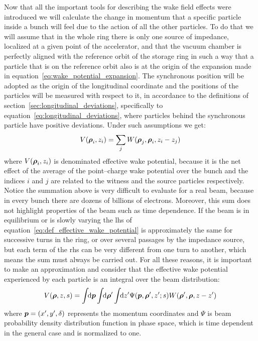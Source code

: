    Now that all the important tools for describing the wake field effects were introduced we will calculate the change in momentum that a specific particle inside a bunch will feel due to the action of all the other particles. To do that we will assume that in the whole ring there is only one source of impedance, localized at a given point of the accelerator, and that the vacuum chamber is perfectly aligned with the reference orbit of the storage ring in such a way that a particle that is on the reference orbit also is at the origin of the expansion made in equation~\eqref{eq:wake_potential_expansion}. The synchronous position will be adopted as the origin of the longitudinal coordinate and the positions of the particles will be measured with respect to it, in accordance to the definitions of section~\ref{sec:longitudinal_deviations}, specifically to equation~\eqref{eq:longitudinal_deviations}, where particles behind the synchronous particle have positive deviations. Under such assumptions we get:
    \begin{align}\label{eq:def_effective_wake_potential}
  	    V(\boldsymbol{\rho}_i, z_i) = \sum_j W(\boldsymbol{\rho}_j,\boldsymbol{\rho}_i,z_i-z_j)
    \end{align}
    where $V(\boldsymbol{\rho}_i, z_i)$ is denominated effective wake potential, because it is the net effect of the average of the point--charge wake potential over the bunch and the indices $i$ and $j$ are related to the witness and the source particles respectively. Notice the summation above is very difficult to evaluate for a real beam, because in every bunch there are dozens of billions of electrons. Moreover, this sum does not highlight properties of the beam such as time dependence. If the beam is in equilibrium or is slowly varying the \gls{lhs} of equation~\eqref{eq:def_effective_wake_potential} is approximately the same for successive turns in the ring, or over several passages by the impedance source, but each term of the \gls{rhs} can be very different from one turn to another, which means the sum must always be carried out. For all these reasons, it is important to make an approximation and consider that the effective wake potential experienced by each particle is an integral over the beam distribution:
    \begin{align}\label{eq:int_effective_wake_potential}
  	  	V(\boldsymbol{\rho}, z, s) = \int\!\!\text{d}\boldsymbol{p} \int\!\!\text{d}\boldsymbol{\rho}' \int\!\!\text{d}z' 
	  			\Psi(\boldsymbol{p},\boldsymbol{\rho}',z'; s) W(\boldsymbol{\rho}',\boldsymbol{\rho},z-z')
    \end{align}
    where $\boldsymbol{p} = (x', y', \delta)$ represents the momentum coordinates and $\Psi$ is beam probability density distribution function in phase space, which is time dependent in the general case and is normalized to one.

